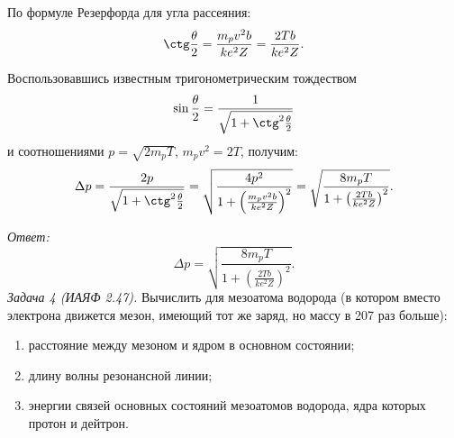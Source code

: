 По формуле Резерфорда для угла рассеяния:
\[
    \ctg\frac{\theta}{2} = \frac{m_pv^2b}{ke^2Z} = \frac{2Tb}{ke^2Z}.
\]

Воспользовавшись известным тригонометрическим тождеством
\[
    \sin\frac{\theta}{2} = \frac{1}{\sqrt{1 + \ctg^2\frac{\theta}{2}}}
\]
и соотношениями \( p = \sqrt{2m_pT} \), \( m_pv^2 = 2T \), получим:
\[
    \Delta p = \frac{2p}{\sqrt{1 + \ctg^2\frac{\theta}{2}}} = \sqrt{\frac{4p^2}
    {1 + \left(\frac{m_pv^2b}{ke^2Z}\right)^2}} = \sqrt{\frac{8m_pT}{1 + \left(
    \frac{2Tb}{ke^2Z}\right)^2}}.
\]

\vspace*{2em}
\emph{Ответ:}
\vspace*{-1.7em}
\[
    \Delta p = \sqrt{\frac{8m_pT}{1 + \left(\frac{2Tb}{ke^2Z}\right)^2}}.
\]
\newpage
\emph{Задача 4 (ИАЯФ 2.47).}
Вычислить для мезоатома водорода (в котором вместо электрона движется мезон,
имеющий тот же заряд, но массу в 207 раз больше):
\vspace*{-.9em}
\begin{enumerate} \itemsep-.5em
    \item расстояние между мезоном и ядром в основном состоянии;
    \item длину волны резонансной линии;
    \item энергии связей основных состояний мезоатомов водорода, ядра которых
    протон и дейтрон.
\end{enumerate}

